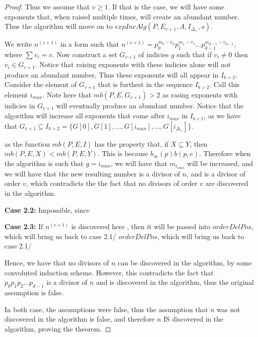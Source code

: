 \documentclass[../paper.tex]{subfiles}
\begin{document}
\begin{proof}
  Thus we assume that $v \geq 1$. If that is the case, we will
have some exponents that, when raised multiple times, will create
an abundant number. Thus the algorithm will move on to
$expIncAlg(P,E_{v+1},A, I_{\Delta_+}, s)$.

  We write $n^{(v + 1)}$ in a form such that $n^{(v + 1)} =
p_0^{m_0 - v_0} p_1 ^{m_1 - v_1} ... p_{d-1}^{m_{d-1} - v_{d-1}}$,
where $\sum v_i = v$. Now construct a set $G_{v+1}$ of indicies 
$g$ such that if $v_i \neq 0$ then $v_i \in G_{v+1}$. Notice that
raising exponents with these indicies alone will not produce an 
abundant number, Thus these exponents will all appear in $I_{b >
2}$. Consider the element of $G_{v+1}$ that is furthest in the
sequence $I_{b > 2}$. Call this element $i_{max}$. Note here that
$mb(P,E,G_{v+1}) > 2$ as rasing exponents with indicies in 
$G_{v+1}$ will eventually produce an abundant number. Notice that the
algorithm will increase all exponents that come after $i_{max}$ in
$I_{b+1}$,
as we have that $G_{v + 1} \subseteq I_{b > 2} = 
                          \{G[0], G[1], 
	                        ..., G[i_{max}],...,
                          G[i_{\Delta_+}]\}$.

as the function $mb(P,E,I)$ has the property that, if $X \subseteq
Y$, then $mb(P,E,X) < mb (P,E,Y)$. This is because $b_{\infty}(p)
b(p,e)$. Therefore when the algorithm is such that
$g = i_{max}$, we will have that $m_{i_{max}}$ will
be increased, and we will have that the new resulting number is a
divisor of $n$, and is a divisor of order $v$, which contradicts
the the fact that no divisors of order $v$ are discovered in the
algorithm.  

\textbf{Case 2.2:}
Impossible, since 


\textbf{Case 2.3:}
If $n^{(v+1)}$ is discovered here , then it will be passed into
$orderDelPos$, which will bring us back to case 2.1/
$orderDelPos$, which will bring us back to case 2.1/

Hence, we have that no divisors of $n$ can be discovered in the
algorithm, by some convoluted induction scheme. However, this
contradicts the fact that $p_0 p_1 p_2 ... p_{d-1}$ is a divisor
of $n$ and is discovered in the algorithm, thus the original
assumption is false.

In both case, the assumptions were false, thus the assumption that
$n$ was not discovered in the algorithm is false, and therefore
$n$ IS discovered in the algorithm, proving the theorem.

\end{proof}
\end{document}
